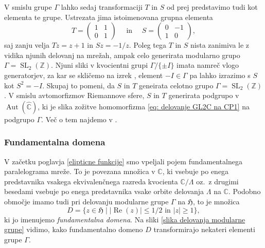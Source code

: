\documentclass[mat1]{fmfdelo}
\numberwithin{equation}{section}
\newcommand{\Z}{\mathbb Z}
\newcommand{\C}{\mathbb C}
\newcommand{\HH}{\mathfrak{H}}
\newcommand{\RS}{\widehat{\C}}
\newcommand{\torus}{\C/\Lambda}
\newcommand{\SL}{\Gamma}
\newcommand{\abs}[1]{\left\lvert #1 \right\rvert}
\renewcommand\Re{\operatorname{Re}}%
\newcommand{\oz}{oz.\ }
\DeclareMathOperator{\Aut}{Aut}
\theoremstyle{definition}
\begin{document}
V smislu grupe $\SL$ lahko sedaj transformaciji $T$ in $S$ od prej predstavimo tudi kot elementa te grupe. Ustrezata jima istoimenovana grupna elementa
\[
    T = \begin{pmatrix}1 & 1 \\ 0 & 1\end{pmatrix} \quad \text{ in } \quad
    S = \begin{pmatrix}0 & -1 \\ 1 & 0\end{pmatrix},
\]
saj zanju velja $Tz = z + 1$ in $Sz = -1/z$. Poleg tega $T$ in $S$ nista zanimiva le z vidika njunih delovanj na mrežah, ampak celo generirata modularno grupo $\SL = \operatorname{SL}_2(\Z)$. Njuni sliki v kvocientni grupi $\SL/\{\pm I\}$ imata namreč vlogo generatorjev, za kar se skličemo na izrek \cite[VII, \S 1, theorem 2]{Serre}, element $-I \in \SL$ pa lahko izrazimo s $S$ kot $S^2 = -I$. Skupaj to pomeni, da $S$ in $T$ geneirata celotno grupo $\SL = \operatorname{SL}_2(\Z)$. V smislu avtomorfizmov Riemannove sfere, $S$ in $T$ generirata podgrupo v $\Aut(\RS)$, ki je slika zožitve homomorfizma \eqref{eq: delovanje GL2C na CP1} na podgrupo $\SL$. Več o tem najdemo v \cite[VII, \S 1]{Serre}.

\subsubsection*{Fundamentalna domena}

V začetku poglavja \ref{elipticne funkcije} smo vpeljali pojem fundamentalnega paralelograma mreže. To je povezana množica v $\C$, ki vsebuje po enega predstavnika vsakega ekvivalenčnega razreda kvocienta $\torus$ \oz z drugimi besedami vsebuje po enega predstavnika vsake orbite delovanja $\Lambda$ na $\C$. Podobno območje imamo tudi pri delovanju modularne grupe $\SL$ na $\HH$, to je množica 
\[
    D = \{z \in \HH \mid \abs{\Re(z)} \leq 1/2 \text{ in } \abs{z} \geq 1\},
\]
ki jo imenujemo \emph{fundamentalna domena}. Na sliki \ref{slika delovanja modularne grupe} vidimo, kako fundamentalno domeno $D$ transformirajo nekateri elementi grupe $\SL$.
\end{document}
